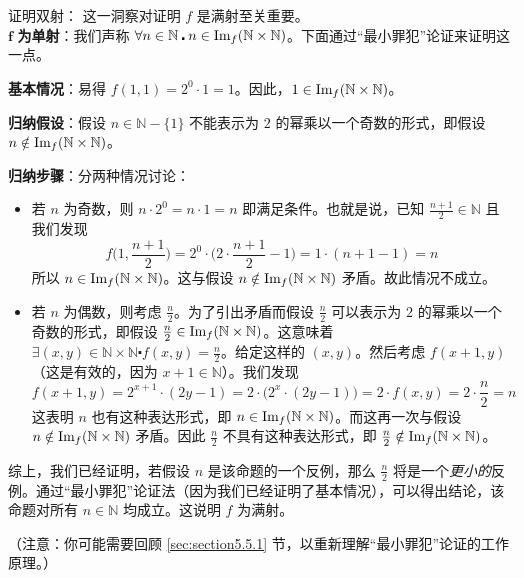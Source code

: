 \begin{example}
\begin{proofs}{证明双射：}
        这一洞察对证明 $f$ 是满射至关重要。\\

        $\mathbf{f}$ \textbf{为单射}：我们声称 $\forall n \in \mathbb{N} \centerdot n \in \text{Im}_f (\mathbb{N} \times \mathbb{N})$。下面通过``最小罪犯''论证来证明这一点。

        \textbf{基本情况}：易得 $f(1, 1) = 2^0 \cdot 1 = 1$。因此，$1 \in \text{Im}_f (\mathbb{N} \times \mathbb{N})$。

        \textbf{归纳假设}：假设 $n \in \mathbb{N} - \{1\}$ 不能表示为 $2$ 的幂乘以一个奇数的形式，即假设 $n \notin \text{Im}_f (\mathbb{N} \times \mathbb{N})$。

        \textbf{归纳步骤}：分两种情况讨论：
        \begin{itemize}
            \item 若 $n$ 为奇数，则 $n \cdot 2^0 = n \cdot 1 = n$ 即满足条件。也就是说，已知 $\frac{n+1}{2} \in \mathbb{N}$ 且我们发现
                  \[f\Big(1, \frac{n+1}{2}\Big) = 2^0 \cdot \Big(2 \cdot \frac{n+1}{2}-1\Big) = 1 \cdot (n + 1 - 1) = n\]
                  所以 $n \in \text{Im}_f (\mathbb{N} \times \mathbb{N})$。这与假设 $n \notin \text{Im}_f (\mathbb{N} \times \mathbb{N})$ 矛盾。故此情况不成立。
            \item 若  $n$ 为偶数，则考虑 $\frac{n}{2}$。为了引出矛盾而假设 $\frac{n}{2}$ 可以表示为 $2$ 的幂乘以一个奇数的形式，即假设 $\frac{n}{2} \in \text{Im}_f (\mathbb{N} \times \mathbb{N})$。这意味着 $\exists (x, y) \in \mathbb{N} \times \mathbb{N} \centerdot f(x, y) = \frac{n}{2}$。给定这样的 $(x,y)$。然后考虑 $f(x + 1, y)$（这是有效的，因为 $x+1 \in \mathbb{N}$）。我们发现
                  \[f(x + 1, y) = 2^{x+1} \cdot (2y - 1) = 2 \cdot \big(2^x \cdot (2y - 1)\big) =  2 \cdot f(x, y) = 2 \cdot \frac{n}{2} = n\]
                  这表明 $n$ 也有这种表达形式，即 $n \in \text{Im}_f (\mathbb{N} \times \mathbb{N})$。而这再一次与假设 $n \notin \text{Im}_f (\mathbb{N} \times \mathbb{N})$ 矛盾。因此 $\frac{n}{2}$ 不具有这种表达形式，即 $\frac{n}{2} \notin \text{Im}_f (\mathbb{N} \times \mathbb{N})$。
        \end{itemize}

        综上，我们已经证明，若假设 $n$ 是该命题的一个反例，那么 $\frac{n}{2}$ 将是一个\emph{更小的}反例。通过``最小罪犯''论证法（因为我们已经证明了基本情况），可以得出结论，该命题对所有 $n \in \mathbb{N}$ 均成立。这说明 $f$ 为满射。

        （注意：你可能需要回顾 \ref{sec:section5.5.1} 节，以重新理解``最小罪犯''论证的工作原理。）\\


\end{proofs}
\end{example}
